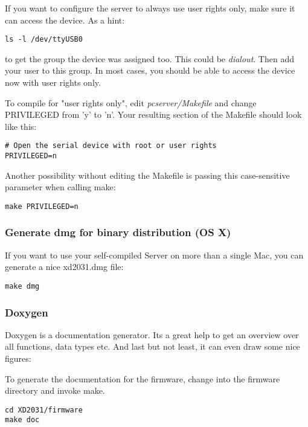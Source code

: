 If you want to configure the server to always use user rights only, make sure
it can access the device. As a hint:

\begin{verbatim}
ls -l /dev/ttyUSB0
\end{verbatim}

to get the group the device was assigned too. This could be \textit{dialout}.
Then add your user to this group. In most cases, you should be able to
access the device now with user rights only.

To compile for "user rights only", edit 
\textit{pcserver/Makefile} and change PRIVILEGED from 'y' to 'n'.
Your resulting section of the Makefile should look like this:

\begin{verbatim}
# Open the serial device with root or user rights
PRIVILEGED=n
\end{verbatim}

Another possibility without editing the Makefile is passing this
case-sensitive parameter when calling make:

\begin{verbatim}
make PRIVILEGED=n
\end{verbatim}

\subsubsection{Generate dmg for binary distribution (OS X)}
If you want to use your self-compiled Server on more than a single Mac,
you can generate a nice xd2031.dmg file:

\begin{verbatim}
make dmg
\end{verbatim}


\clearpage
\subsubsection{Doxygen}
Doxygen is a documentation generator. Its a great help to get
an overview over all functions, data types etc. And last but not least,
it can even draw some nice figures:

To generate the documentation for the firmware, change into the firmware
directory and invoke make. 

\begin{verbatim}
cd XD2031/firmware
make doc
\end{verbatim}

